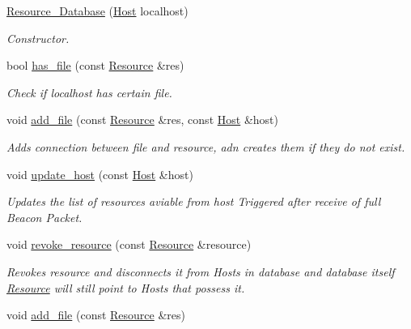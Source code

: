 \begin{DoxyCompactItemize}
\item 
\hyperlink{classsimpleP2P_1_1Resource__Database_a0158b1b1c4583d60534c2bea5dc437a3}{Resource\+\_\+\+Database} (\hyperlink{classsimpleP2P_1_1Host}{Host} localhost)
\begin{DoxyCompactList}\small\item\em Constructor. \end{DoxyCompactList}\item 
bool \hyperlink{classsimpleP2P_1_1Resource__Database_a2a6cd0b6da11176aec9ef7f218ac1c62}{has\+\_\+file} (const \hyperlink{classsimpleP2P_1_1Resource}{Resource} \&res)
\begin{DoxyCompactList}\small\item\em Check if localhost has certain file. \end{DoxyCompactList}\item 
void \hyperlink{classsimpleP2P_1_1Resource__Database_a7afdd297b15fb225b61f9d52e2ab9cc6}{add\+\_\+file} (const \hyperlink{classsimpleP2P_1_1Resource}{Resource} \&res, const \hyperlink{classsimpleP2P_1_1Host}{Host} \&host)
\begin{DoxyCompactList}\small\item\em Adds connection between file and resource, adn creates them if they do not exist. \end{DoxyCompactList}\item 
void \hyperlink{classsimpleP2P_1_1Resource__Database_a181e862da4be11acbdb7d5569ad6925a}{update\+\_\+host} (const \hyperlink{classsimpleP2P_1_1Host}{Host} \&host)
\begin{DoxyCompactList}\small\item\em Updates the list of resources aviable from host Triggered after receive of full Beacon Packet. \end{DoxyCompactList}\item 
void \hyperlink{classsimpleP2P_1_1Resource__Database_a7ea91d496814c3d911b14ef4cd863943}{revoke\+\_\+resource} (const \hyperlink{classsimpleP2P_1_1Resource}{Resource} \&resource)
\begin{DoxyCompactList}\small\item\em Revokes resource and disconnects it from Hosts in database and database itself \hyperlink{classsimpleP2P_1_1Resource}{Resource} will still point to Hosts that possess it. \end{DoxyCompactList}\item 
void \hyperlink{classsimpleP2P_1_1Resource__Database_a8ac7f42f7de6f3281974d2be7f1ea8e8}{add\+\_\+file} (const \hyperlink{classsimpleP2P_1_1Resource}{Resource} \&res)

\end{DoxyCompactItemize}
